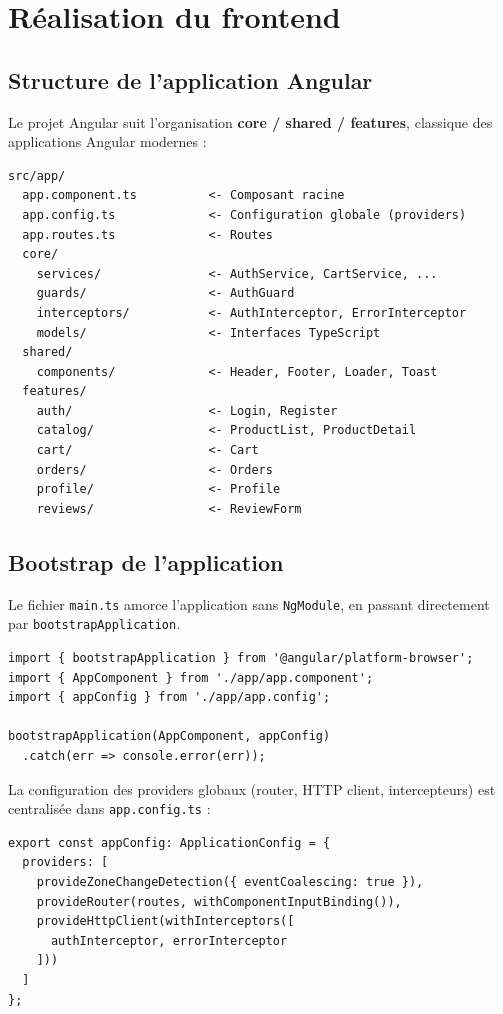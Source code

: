 \documentclass[11pt,a4paper,oneside]{report}
\begin{document}
\chapter{Réalisation du frontend}

\section{Structure de l'application Angular}

Le projet Angular suit l'organisation \textbf{core / shared / features},
classique des applications Angular modernes :

\begin{lstlisting}[style=shellstyle]
src/app/
  app.component.ts          <- Composant racine
  app.config.ts             <- Configuration globale (providers)
  app.routes.ts             <- Routes
  core/
    services/               <- AuthService, CartService, ...
    guards/                 <- AuthGuard
    interceptors/           <- AuthInterceptor, ErrorInterceptor
    models/                 <- Interfaces TypeScript
  shared/
    components/             <- Header, Footer, Loader, Toast
  features/
    auth/                   <- Login, Register
    catalog/                <- ProductList, ProductDetail
    cart/                   <- Cart
    orders/                 <- Orders
    profile/                <- Profile
    reviews/                <- ReviewForm
\end{lstlisting}

\section{Bootstrap de l'application}

Le fichier \texttt{main.ts} amorce l'application sans \texttt{NgModule},
en passant directement par \texttt{bootstrapApplication}.

\begin{lstlisting}[style=tsstyle, caption=main.ts]
import { bootstrapApplication } from '@angular/platform-browser';
import { AppComponent } from './app/app.component';
import { appConfig } from './app/app.config';

bootstrapApplication(AppComponent, appConfig)
  .catch(err => console.error(err));
\end{lstlisting}

La configuration des providers globaux (router, HTTP client, intercepteurs)
est centralisée dans \texttt{app.config.ts} :

\begin{lstlisting}[style=tsstyle, caption=app.config.ts]
export const appConfig: ApplicationConfig = {
  providers: [
    provideZoneChangeDetection({ eventCoalescing: true }),
    provideRouter(routes, withComponentInputBinding()),
    provideHttpClient(withInterceptors([
      authInterceptor, errorInterceptor
    ]))
  ]
};
\end{lstlisting}
\end{document}
